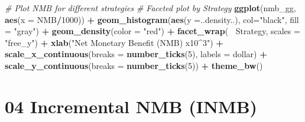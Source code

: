 \documentclass[
]{article}
\newenvironment{Shaded}{\begin{snugshade}}{\end{snugshade}}
\newcommand{\CommentTok}[1]{\textcolor[rgb]{0.56,0.35,0.01}{\textit{#1}}}
\newcommand{\DataTypeTok}[1]{\textcolor[rgb]{0.13,0.29,0.53}{#1}}
\newcommand{\DecValTok}[1]{\textcolor[rgb]{0.00,0.00,0.81}{#1}}
\newcommand{\KeywordTok}[1]{\textcolor[rgb]{0.13,0.29,0.53}{\textbf{#1}}}
\newcommand{\NormalTok}[1]{#1}
\newcommand{\OperatorTok}[1]{\textcolor[rgb]{0.81,0.36,0.00}{\textbf{#1}}}
\newcommand{\StringTok}[1]{\textcolor[rgb]{0.31,0.60,0.02}{#1}}
\begin{document}
\begin{Shaded}
\begin{Highlighting}[]
\CommentTok{# Plot NMB for different strategies}
\CommentTok{# Faceted plot by Strategy}
\KeywordTok{ggplot}\NormalTok{(nmb_gg, }\KeywordTok{aes}\NormalTok{(}\DataTypeTok{x =}\NormalTok{ NMB}\OperatorTok{/}\DecValTok{1000}\NormalTok{)) }\OperatorTok{+}
\StringTok{  }\KeywordTok{geom_histogram}\NormalTok{(}\KeywordTok{aes}\NormalTok{(}\DataTypeTok{y =}\NormalTok{..density..), }\DataTypeTok{col=}\StringTok{"black"}\NormalTok{, }\DataTypeTok{fill =} \StringTok{"gray"}\NormalTok{) }\OperatorTok{+}
\StringTok{  }\KeywordTok{geom_density}\NormalTok{(}\DataTypeTok{color =} \StringTok{"red"}\NormalTok{) }\OperatorTok{+}
\StringTok{  }\KeywordTok{facet_wrap}\NormalTok{(}\OperatorTok{~}\StringTok{ }\NormalTok{Strategy, }\DataTypeTok{scales =} \StringTok{"free_y"}\NormalTok{) }\OperatorTok{+}
\StringTok{  }\KeywordTok{xlab}\NormalTok{(}\StringTok{"Net Monetary Benefit (NMB) x10^3"}\NormalTok{) }\OperatorTok{+}
\StringTok{  }\KeywordTok{scale_x_continuous}\NormalTok{(}\DataTypeTok{breaks =} \KeywordTok{number_ticks}\NormalTok{(}\DecValTok{5}\NormalTok{), }\DataTypeTok{labels =}\NormalTok{ dollar) }\OperatorTok{+}\StringTok{ }
\StringTok{  }\KeywordTok{scale_y_continuous}\NormalTok{(}\DataTypeTok{breaks =} \KeywordTok{number_ticks}\NormalTok{(}\DecValTok{5}\NormalTok{)) }\OperatorTok{+}\StringTok{ }
\StringTok{  }\KeywordTok{theme_bw}\NormalTok{()}
\end{Highlighting}
\end{Shaded}

\hypertarget{incremental-nmb-inmb}{%
\section{04 Incremental NMB (INMB)}\label{incremental-nmb-inmb}}
\end{document}
